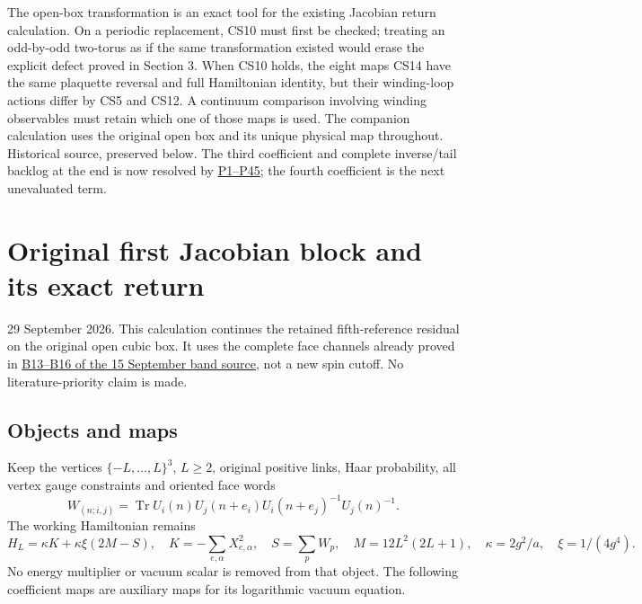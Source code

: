 \documentclass[11pt]{article}
\begin{document}
The open-box transformation is an exact tool for the existing Jacobian return calculation. On a periodic replacement, CS10 must first be checked; treating an odd-by-odd two-torus as if the same transformation existed would erase the explicit defect proved in Section 3. When CS10 holds, the eight maps CS14 have the same plaquette reversal and full Hamiltonian identity, but their winding-loop actions differ by CS5 and CS12. A continuum comparison involving winding observables must retain which one of those maps is used. The companion calculation uses the original open box and its unique physical map throughout.
\clearpage
Historical source, preserved below. The third coefficient and complete inverse/tail backlog at the end is now resolved by \href{https://github.com/KokunoYumeto/yang-mills-interacting-workbench/blob/main/yang-mills/continuations/20261011-central-signs-shrinking-window/ORIGINAL_J5_PARITY_AND_TAIL.md}{P1–P45}; the fourth coefficient is the next unevaluated term.

\section*{Original first Jacobian block and its exact return}

29 September 2026. This calculation continues the retained fifth-reference residual on the original open cubic box. It uses the complete face channels already proved in \href{https://github.com/KokunoYumeto/yang-mills-interacting-workbench/blob/fa79faff2cd697e16cfa3a7953f36810c22c8922/yang-mills/continuations/20260915-gauge-native-band/BAND_AND_CERTIFICATE.md#L125}{B13–B16 of the 15 September band source}, not a new spin cutoff. No literature-priority claim is made.

\subsection*{Objects and maps}

Keep the vertices \(\{-L,\ldots,L\}^3\), \(L\ge2\), original positive links, Haar probability, all vertex gauge constraints and oriented face words
\[
 W_{(n;i,j)}=\operatorname{Tr}U_i(n)U_j(n+e_i)
 U_i(n+e_j)^{-1}U_j(n)^{-1}.
\]
The working Hamiltonian remains
\[
 H_L=\kappa K+\kappa\xi(2M-S),\quad
 K=-\sum_{e,\alpha}X_{e,\alpha}^2,\quad
 S=\sum_pW_p,\quad M=12L^2(2L+1),\quad
 \kappa=2g^2/a,\quad\xi=1/(4g^4).
\]
No energy multiplier or vacuum scalar is removed from that object. The following coefficient maps are auxiliary maps for its logarithmic vacuum equation.
\end{document}

